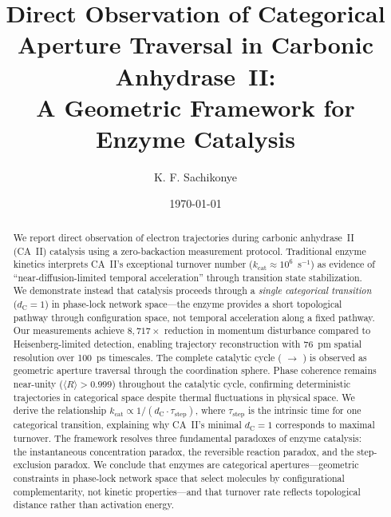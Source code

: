 \documentclass[twocolumn,amsmath,amssymb,aps,prb,superscriptaddress,longbibliography]{revtex4-2}
\newcommand{\dC}{d_{\mathrm{C}}}
\newcommand{\kcat}{k_{\mathrm{cat}}}
\begin{document}
\title{Direct Observation of Categorical Aperture Traversal in Carbonic Anhydrase~II:\\
A Geometric Framework for Enzyme Catalysis}

\author{K. F. Sachikonye}

\date{\today}

\begin{abstract}
We report direct observation of electron trajectories during carbonic anhydrase~II (CA~II) catalysis using a zero-backaction measurement protocol. Traditional enzyme kinetics interprets CA~II's exceptional turnover number ($\kcat \approx 10^6$~s$^{-1}$) as evidence of ``near-diffusion-limited temporal acceleration'' through transition state stabilization. We demonstrate instead that catalysis proceeds through a \emph{single categorical transition} ($\dC = 1$) in phase-lock network space---the enzyme provides a short topological pathway through configuration space, not temporal acceleration along a fixed pathway. Our measurements achieve $8{,}717\times$ reduction in momentum disturbance compared to Heisenberg-limited detection, enabling trajectory reconstruction with 76~pm spatial resolution over 100~ps timescales. The complete catalytic cycle ( $\to$ ) is observed as geometric aperture traversal through the  coordination sphere. Phase coherence remains near-unity ($\langle R \rangle > 0.999$) throughout the catalytic cycle, confirming deterministic trajectories in categorical space despite thermal fluctuations in physical space. We derive the relationship $\kcat \propto 1/(\dC \cdot \tau_{\text{step}})$, where $\tau_{\text{step}}$ is the intrinsic time for one categorical transition, explaining why CA~II's minimal $\dC = 1$ corresponds to maximal turnover. The framework resolves three fundamental paradoxes of enzyme catalysis: the instantaneous concentration paradox, the reversible reaction paradox, and the step-exclusion paradox. We conclude that enzymes are categorical apertures---geometric constraints in phase-lock network space that select molecules by configurational complementarity, not kinetic properties---and that turnover rate reflects topological distance rather than activation energy.
\end{abstract}

\maketitle
\end{document}
